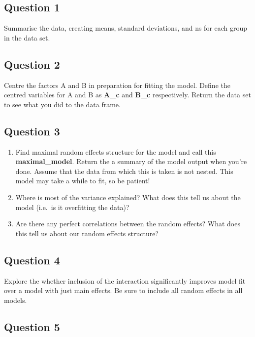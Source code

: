 \documentclass[
]{book}
\providecommand{\tightlist}{%
  \setlength{\itemsep}{0pt}\setlength{\parskip}{0pt}}
\begin{document}
\hypertarget{question-1-8}{%
\subsection{Question 1}\label{question-1-8}}

Summarise the data, creating means, standard deviations, and ns for each group in the data set.

\hypertarget{question-2-8}{%
\subsection{Question 2}\label{question-2-8}}

Centre the factors A and B in preparation for fitting the model. Define the centred variables for A and B as \textbf{A\_c} and \textbf{B\_c} respectively. Return the data set to see what you did to the data frame.

\hypertarget{question-3-8}{%
\subsection{Question 3}\label{question-3-8}}

\begin{enumerate}
\def\labelenumi{\alph{enumi}.}
\tightlist
\item
  Find maximal random effects structure for the model and call this \textbf{maximal\_model}. Return the a summary of the model output when you're done. Assume that the data from which this is taken is not nested. This model may take a while to fit, so be patient!
\item
  Where is most of the variance explained? What does this tell us about the model (i.e.~is it overfitting the data)?
\item
  Are there any perfect correlations between the random effects? What does this tell us about our random effects structure?
\end{enumerate}

\hypertarget{question-4-8}{%
\subsection{Question 4}\label{question-4-8}}

Explore the whether inclusion of the interaction significantly improves model fit over a model with just main effects. Be sure to include all random effects in all models.

\hypertarget{question-5-8}{%
\subsection{Question 5}\label{question-5-8}}
\end{document}
